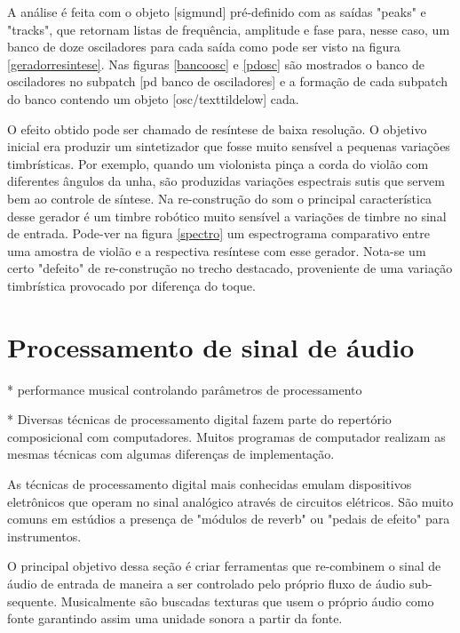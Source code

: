 \documentclass{ppgmus}
\begin{document}
A análise é feita com o objeto [sigmund\texttildelow] pré-definido com
as saídas "peaks" e "tracks", que retornam listas de frequência, amplitude e 
fase para, nesse caso, um banco de doze osciladores para cada saída como pode 
ser visto na figura \ref{geradorresintese}.
Nas figuras \ref{bancoosc} e \ref{pdosc} são mostrados o banco de osciladores no subpatch
[pd banco de osciladores] e a formação de cada subpatch do banco contendo um objeto [osc/texttildelow]
cada. 
 
O efeito obtido pode ser chamado de resíntese de baixa resolução. O objetivo
inicial era produzir um sintetizador que fosse muito sensível a pequenas
variações timbrísticas. Por exemplo, quando um violonista pinça a corda do violão
com diferentes ângulos da unha, são produzidas variações espectrais sutis que servem
bem ao controle de síntese. Na re-construção do som o principal característica desse
gerador é um timbre robótico muito sensível a variações de timbre no sinal de entrada.
Pode-ver na figura \ref{spectro} um espectrograma comparativo entre uma amostra
de violão e a respectiva resíntese com esse gerador. Nota-se um certo "defeito"
de re-construção no trecho destacado, proveniente de uma variação timbrística provocado
por diferença do toque. 




\pagebreak

\section{Processamento de sinal de áudio}


* performance musical controlando parâmetros de processamento

* Diversas técnicas de processamento digital fazem parte do repertório
composicional com computadores. Muitos programas de computador realizam
as mesmas técnicas com algumas diferenças de implementação.

As técnicas de processamento digital mais conhecidas emulam dispositivos
eletrônicos que operam no sinal analógico através de circuitos elétricos.
São muito comuns em estúdios a presença de "módulos de reverb" ou 
"pedais de efeito" para instrumentos. 

O principal objetivo dessa seção é criar ferramentas que re-combinem
o sinal de áudio de entrada de maneira a ser controlado pelo próprio
fluxo de áudio sub-sequente. Musicalmente são buscadas texturas que usem
o próprio áudio como fonte garantindo assim uma unidade sonora a partir da fonte.
\end{document}
